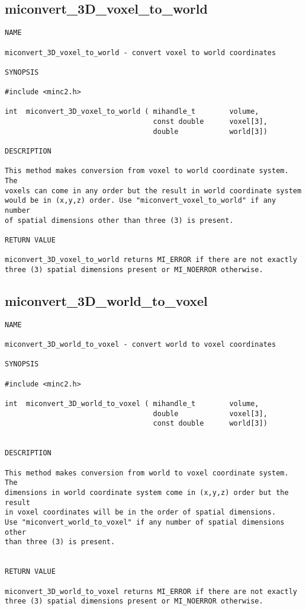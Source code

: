 \documentclass{article}
\begin{document}
\subsection{miconvert\_3D\_voxel\_to\_world}
\begin{verbatim}
NAME 

miconvert_3D_voxel_to_world - convert voxel to world coordinates

SYNOPSIS

#include <minc2.h>

int  miconvert_3D_voxel_to_world ( mihandle_t        volume,
                                   const double      voxel[3],
                                   double            world[3])
                                
DESCRIPTION

This method makes conversion from voxel to world coordinate system. The
voxels can come in any order but the result in world coordinate system 
would be in (x,y,z) order. Use "miconvert_voxel_to_world" if any number
of spatial dimensions other than three (3) is present.

RETURN VALUE

miconvert_3D_voxel_to_world returns MI_ERROR if there are not exactly
three (3) spatial dimensions present or MI_NOERROR otherwise.
\end{verbatim}

\subsection{miconvert\_3D\_world\_to\_voxel}
\begin{verbatim}
NAME 

miconvert_3D_world_to_voxel - convert world to voxel coordinates

SYNOPSIS

#include <minc2.h>

int  miconvert_3D_world_to_voxel ( mihandle_t        volume,
                                   double            voxel[3],
                                   const double      world[3])
                       
                                
DESCRIPTION

This method makes conversion from world to voxel coordinate system. The
dimensions in world coordinate system come in (x,y,z) order but the result  
in voxel coordinates will be in the order of spatial dimensions. 
Use "miconvert_world_to_voxel" if any number of spatial dimensions other
than three (3) is present.


RETURN VALUE

miconvert_3D_world_to_voxel returns MI_ERROR if there are not exactly
three (3) spatial dimensions present or MI_NOERROR otherwise.
\end{verbatim}
\end{document}
